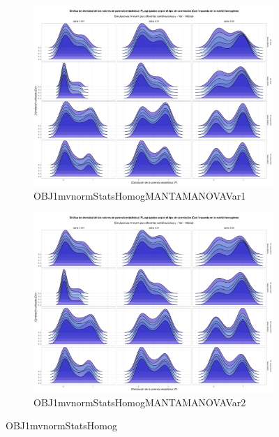 \documentclass[IB,BIB]{TFUOC}%
\begin{document}
\begin{figure}
\begin{subfigure}{0.49\textwidth}
\centering
\includegraphics[width = \textwidth]{OBJ1mvnormStatsHomogMANTAMANOVAVar1.pdf}
\caption{OBJ1mvnormStatsHomogMANTAMANOVAVar1}
\label{figAppend:OBJ1mvnormStatsHomogMANTAMANOVAVar1}
\end{subfigure}
\begin{subfigure}{0.49\textwidth}
\centering
\includegraphics[width = \textwidth]{OBJ1mvnormStatsHomogMANTAMANOVAVar2.pdf}
\caption{OBJ1mvnormStatsHomogMANTAMANOVAVar2}
\label{figAppend:OBJ1mvnormStatsHomogMANTAMANOVAVar2}
\end{subfigure}
\caption{OBJ1mvnormStatsHomog}
\label{figAppend:combined}
\end{figure}
\end{document}
